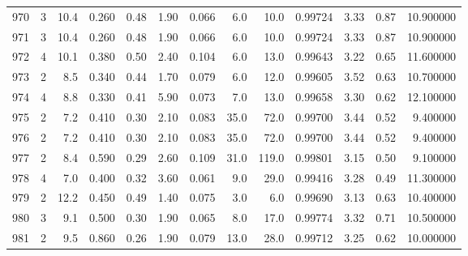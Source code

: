 \begin{tabular}{lrrrrrrrrrrrr}
970  &        3 &           10.4 &             0.260 &         0.48 &            1.90 &      0.066 &                  6.0 &                  10.0 &  0.99724 &  3.33 &       0.87 &  10.900000 \\
971  &        3 &           10.4 &             0.260 &         0.48 &            1.90 &      0.066 &                  6.0 &                  10.0 &  0.99724 &  3.33 &       0.87 &  10.900000 \\
972  &        4 &           10.1 &             0.380 &         0.50 &            2.40 &      0.104 &                  6.0 &                  13.0 &  0.99643 &  3.22 &       0.65 &  11.600000 \\
973  &        2 &            8.5 &             0.340 &         0.44 &            1.70 &      0.079 &                  6.0 &                  12.0 &  0.99605 &  3.52 &       0.63 &  10.700000 \\
974  &        4 &            8.8 &             0.330 &         0.41 &            5.90 &      0.073 &                  7.0 &                  13.0 &  0.99658 &  3.30 &       0.62 &  12.100000 \\
975  &        2 &            7.2 &             0.410 &         0.30 &            2.10 &      0.083 &                 35.0 &                  72.0 &  0.99700 &  3.44 &       0.52 &   9.400000 \\
976  &        2 &            7.2 &             0.410 &         0.30 &            2.10 &      0.083 &                 35.0 &                  72.0 &  0.99700 &  3.44 &       0.52 &   9.400000 \\
977  &        2 &            8.4 &             0.590 &         0.29 &            2.60 &      0.109 &                 31.0 &                 119.0 &  0.99801 &  3.15 &       0.50 &   9.100000 \\
978  &        4 &            7.0 &             0.400 &         0.32 &            3.60 &      0.061 &                  9.0 &                  29.0 &  0.99416 &  3.28 &       0.49 &  11.300000 \\
979  &        2 &           12.2 &             0.450 &         0.49 &            1.40 &      0.075 &                  3.0 &                   6.0 &  0.99690 &  3.13 &       0.63 &  10.400000 \\
980  &        3 &            9.1 &             0.500 &         0.30 &            1.90 &      0.065 &                  8.0 &                  17.0 &  0.99774 &  3.32 &       0.71 &  10.500000 \\
981  &        2 &            9.5 &             0.860 &         0.26 &            1.90 &      0.079 &                 13.0 &                  28.0 &  0.99712 &  3.25 &       0.62 &  10.000000 \\

\end{tabular}
